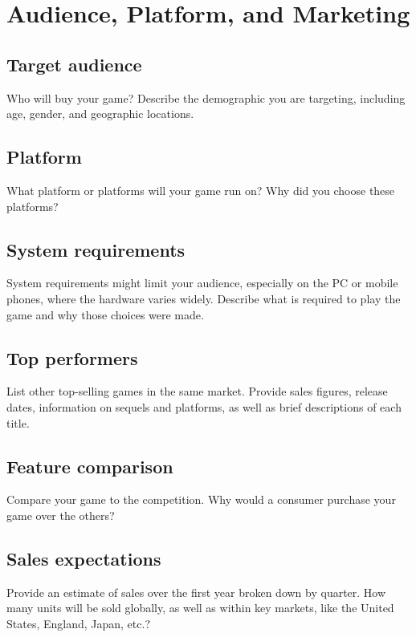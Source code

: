 \chapter{Audience, Platform, and Marketing}
\section{Target audience}%
Who will buy your game? Describe the demographic you are targeting, including age, gender, and geographic locations.

\section{Platform} %
What platform or platforms will your game run on? Why did you choose these platforms?

\section{System requirements} %
System requirements might limit your audience, especially on the PC or mobile phones, where the hardware varies widely. Describe what is required to play the game and why those choices were made.

\section{Top performers} %
List other top-selling games in the same market. Provide sales figures, release dates, information on sequels and platforms, as well as brief descriptions of each title.

\section{Feature comparison} %
Compare your game to the competition. Why would a consumer purchase your game over the others?

\section{Sales expectations} %
Provide an estimate of sales over the first year broken down by quarter. How many units will be sold globally, as well as within key markets, like the United States, England, Japan, etc.?
